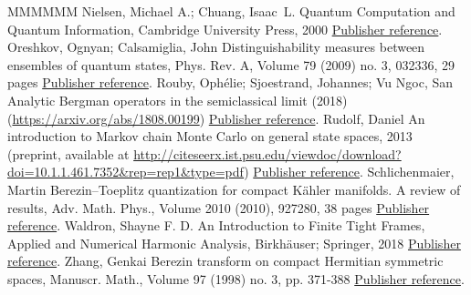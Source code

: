 \begin{thebibliography}{MMMMMM}
 Nielsen, Michael A.; Chuang, Isaac L. Quantum Computation and Quantum Information, Cambridge University Press, 2000 \href{https://ahl.centre-mersenne.org/item/AHL_2020__3__1343_0/#NC}{Publisher reference}.
 Oreshkov, Ognyan; Calsamiglia, John Distinguishability measures between ensembles of quantum states, Phys. Rev. A, Volume 79 (2009) no. 3, 032336, 29 pages \href{https://ahl.centre-mersenne.org/item/AHL_2020__3__1343_0/#OC}{Publisher reference}.
 Rouby, Ophélie; Sjoestrand, Johannes; Vu Ngoc, San Analytic Bergman operators in the semiclassical limit (2018) (\url{https://arxiv.org/abs/1808.00199}) \href{https://ahl.centre-mersenne.org/item/AHL_2020__3__1343_0/#Rouby}{Publisher reference}.
 Rudolf, Daniel An introduction to Markov chain Monte Carlo on general state spaces, 2013 (preprint, available at \url{http://citeseerx.ist.psu.edu/viewdoc/download?doi=10.1.1.461.7352&rep=rep1&type=pdf}) \href{https://ahl.centre-mersenne.org/item/AHL_2020__3__1343_0/#Ru}{Publisher reference}.
 Schlichenmaier, Martin Berezin–Toeplitz quantization for compact Kähler manifolds. A review of results, Adv. Math. Phys., Volume 2010 (2010), 927280, 38 pages \href{https://ahl.centre-mersenne.org/item/AHL_2020__3__1343_0/#S}{Publisher reference}.
 Waldron, Shayne F. D. An Introduction to Finite Tight Frames, Applied and Numerical Harmonic Analysis, Birkhäuser; Springer, 2018 \href{https://ahl.centre-mersenne.org/item/AHL_2020__3__1343_0/#W}{Publisher reference}.
 Zhang, Genkai Berezin transform on compact Hermitian symmetric spaces, Manuscr. Math., Volume 97 (1998) no. 3, pp. 371-388 \href{https://ahl.centre-mersenne.org/item/AHL_2020__3__1343_0/#gap-representations}{Publisher reference}.
\end{thebibliography}
